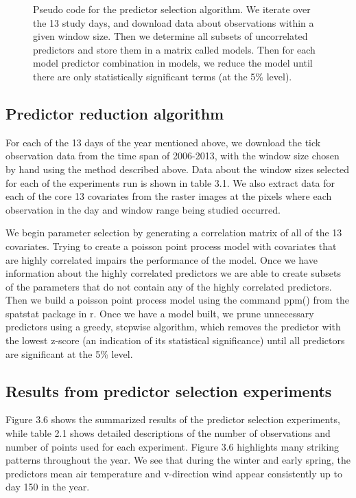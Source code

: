\begin{figure} [!ht]
\centerline{}
\caption{Pseudo code for the predictor selection algorithm. We iterate over the 13 study days, and download data about observations within a given window size. Then we determine all subsets of uncorrelated predictors and store them in a matrix called models. Then for each model predictor combination in models, we reduce the model until there are only statistically significant terms (at the 5\% level).  }
\label{fig6}
\end{figure}
\subsection{ Predictor reduction algorithm}

For each of the 13 days of the year mentioned above, we download the tick observation data from the time span of 2006-2013, with the window size chosen by hand using the method described above. Data about the window sizes selected for each of the experiments run is shown in table 3.1. We also extract data for each of the core 13 covariates from the raster images at the pixels where each observation in the day and window range being studied occurred. \newline

\noindent We begin parameter selection by generating a correlation matrix of all of the 13 covariates. Trying to create a poisson point process model with covariates that are highly correlated impairs the performance of the model. Once we have information about the highly correlated predictors we are able to create subsets of the parameters that do not contain any of the highly correlated predictors. Then we build a poisson point process model using the command ppm() from the spatstat package in r. Once we have a model built, we prune unnecessary predictors using a greedy, stepwise algorithm, which removes the predictor with the lowest z-score (an indication of its statistical significance) until all predictors are significant at the 5\% level.  \newline

\subsection{ Results from predictor selection experiments}

Figure 3.6 shows the summarized results of the predictor selection experiments, while table 2.1 shows detailed descriptions of the number of observations and number of points used for each experiment. Figure 3.6 highlights many striking patterns throughout the year. We see that during the winter and early spring, the predictors mean air temperature and v-direction wind appear consistently up to day 150 in the year. \newline

